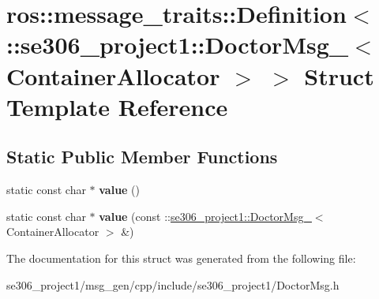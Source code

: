 \hypertarget{structros_1_1message__traits_1_1Definition_3_01_1_1se306__project1_1_1DoctorMsg___3_01ContainerAllocator_01_4_01_4}{\section{ros\-:\-:message\-\_\-traits\-:\-:Definition$<$ \-:\-:se306\-\_\-project1\-:\-:Doctor\-Msg\-\_\-$<$ Container\-Allocator $>$ $>$ Struct Template Reference}
\label{structros_1_1message__traits_1_1Definition_3_01_1_1se306__project1_1_1DoctorMsg___3_01ContainerAllocator_01_4_01_4}
}
\subsection*{Static Public Member Functions}
\begin{DoxyCompactItemize}
\item 
\hypertarget{structros_1_1message__traits_1_1Definition_3_01_1_1se306__project1_1_1DoctorMsg___3_01ContainerAllocator_01_4_01_4_ada7e90b274706a782c74d5aa408f9d64}{static const char $\ast$ {\bfseries value} ()}\label{structros_1_1message__traits_1_1Definition_3_01_1_1se306__project1_1_1DoctorMsg___3_01ContainerAllocator_01_4_01_4_ada7e90b274706a782c74d5aa408f9d64}

\item 
\hypertarget{structros_1_1message__traits_1_1Definition_3_01_1_1se306__project1_1_1DoctorMsg___3_01ContainerAllocator_01_4_01_4_ab123a047e7407f9d9ba2c29267f63ab7}{static const char $\ast$ {\bfseries value} (const \-::\hyperlink{structse306__project1_1_1DoctorMsg__}{se306\-\_\-project1\-::\-Doctor\-Msg\-\_\-}$<$ Container\-Allocator $>$ \&)}\label{structros_1_1message__traits_1_1Definition_3_01_1_1se306__project1_1_1DoctorMsg___3_01ContainerAllocator_01_4_01_4_ab123a047e7407f9d9ba2c29267f63ab7}

\end{DoxyCompactItemize}


The documentation for this struct was generated from the following file\-:\begin{DoxyCompactItemize}
\item 
se306\-\_\-project1/msg\-\_\-gen/cpp/include/se306\-\_\-project1/Doctor\-Msg.\-h\end{DoxyCompactItemize}
